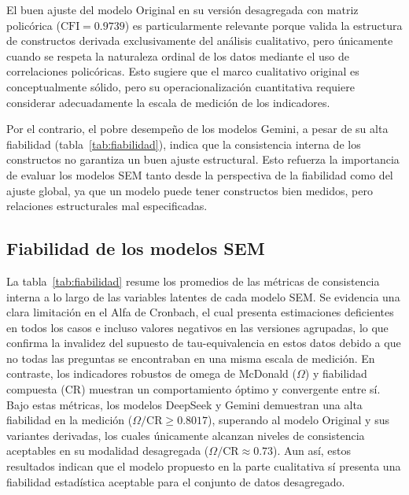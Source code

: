 \documentclass[conference]{IEEEtran}
\begin{document}
El buen ajuste del modelo Original en su versión desagregada con matriz policórica ($\text{CFI} = 0.9739$) es particularmente relevante porque valida la estructura de constructos derivada exclusivamente del análisis cualitativo, pero únicamente cuando se respeta la naturaleza ordinal de los datos mediante el uso de correlaciones policóricas. Esto sugiere que el marco cualitativo original es conceptualmente sólido, pero su operacionalización cuantitativa requiere considerar adecuadamente la escala de medición de los indicadores.

Por el contrario, el pobre desempeño de los modelos Gemini, a pesar de su alta fiabilidad (tabla~\ref{tab:fiabilidad}), indica que la consistencia interna de los constructos no garantiza un buen ajuste estructural. Esto refuerza la importancia de evaluar los modelos SEM tanto desde la perspectiva de la fiabilidad como del ajuste global, ya que un modelo puede tener constructos bien medidos, pero relaciones estructurales mal especificadas.

\subsection{Fiabilidad de los modelos SEM}

La tabla~\ref{tab:fiabilidad} resume los promedios de las métricas de consistencia interna a lo largo de las variables latentes de cada modelo SEM. Se evidencia una clara limitación en el Alfa de Cronbach, el cual presenta estimaciones deficientes en todos los casos e incluso valores negativos en las versiones agrupadas, lo que confirma la invalidez del supuesto de tau-equivalencia en estos datos debido a que no todas las preguntas se encontraban en una misma escala de medición. En contraste, los indicadores robustos de omega de McDonald ($\Omega$) y fiabilidad compuesta ($\mathrm{CR}$) muestran un comportamiento óptimo y convergente entre sí. Bajo estas métricas, los modelos DeepSeek y Gemini demuestran una alta fiabilidad en la medición ($\Omega / \mathrm{CR} \geq 0.8017$), superando al modelo Original y sus variantes derivadas, los cuales únicamente alcanzan niveles de consistencia aceptables en su modalidad desagregada ($\Omega / \mathrm{CR} \approx 0.73$). Aun así, estos resultados indican que el modelo propuesto en la parte cualitativa sí presenta una fiabilidad estadística aceptable para el conjunto de datos desagregado.
\end{document}
